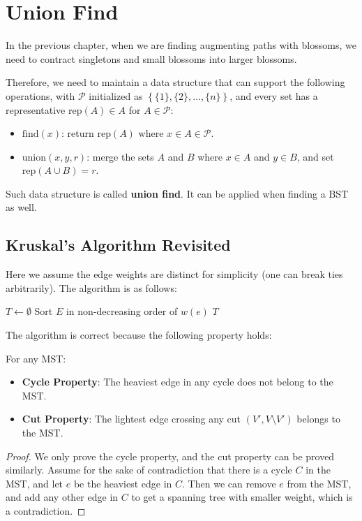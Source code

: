 \chapter{Union Find}

In the previous chapter, when we are finding augmenting paths with blossoms, we need to contract singletons and small blossoms into larger blossoms.

Therefore, we need to maintain a data structure that can support the following operations, with $\mathcal P$ initialized as $\left\{ \{1\}, \{2\}, \ldots, \{n\} \right\}$, and every set has a representative $\text{rep}(A)\in A$ for $A \in \mathcal P$:
\begin{itemize}
	\item $\text{find}(x)$: return $\text{rep}(A)$ where $x\in A\in \mathcal P$.
	\item $\text{union}(x,y,r)$: merge the sets $A$ and $B$ where $x\in A$ and $y\in B$, and set $\text{rep}(A\cup B)=r$.
\end{itemize}

Such data structure is called \textbf{union find}. It can be applied when finding a BST as well.

\section{Kruskal's Algorithm Revisited}

Here we assume the edge weights are distinct for simplicity (one can break ties arbitrarily). The algorithm is as follows:

\begin{algorithm}[H]
	$T\gets \emptyset$\;
	Sort $E$ in non-decreasing order of $w(e)$\;
	\Return $T$\;
	\caption{Kruskal's Algorithm}
\end{algorithm}

The algorithm is correct because the following property holds:
\begin{theorem} \label{theorem:cycle-cut}
	For any MST:
	\begin{itemize}
		\item \textbf{Cycle Property}: The heaviest edge in any cycle does not belong to the MST.
		\item \textbf{Cut Property}: The lightest edge crossing any cut $(V', V\setminus V')$ belongs to the MST.
	\end{itemize}
\end{theorem}
\begin{proof}
	We only prove the cycle property, and the cut property can be proved similarly. Assume for the sake of contradiction that there is a cycle $C$ in the MST, and let $e$ be the heaviest edge in $C$. Then we can remove $e$ from the MST, and add any other edge in $C$ to get a spanning tree with smaller weight, which is a contradiction.
\end{proof}

